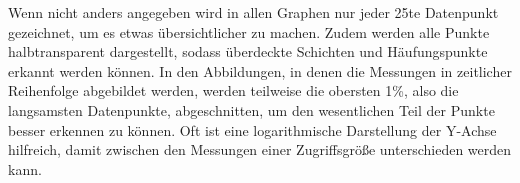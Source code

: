 \documentclass[
	12pt,
	a4paper,
	BCOR10mm,
	DIV14,
	listof=totoc,
	bibliography=totoc,
	headsepline
]{scrreprt}
\begin{document}
Wenn nicht anders angegeben wird in allen Graphen nur jeder 25te Datenpunkt gezeichnet, um es etwas übersichtlicher zu machen.
Zudem werden alle Punkte halbtransparent dargestellt, sodass überdeckte Schichten und Häufungspunkte erkannt werden können.
In den Abbildungen, in denen die Messungen in zeitlicher Reihenfolge abgebildet werden, werden teilweise die obersten 1\%, also die langsamsten Datenpunkte, abgeschnitten, um den wesentlichen Teil der Punkte besser erkennen zu können.
Oft ist eine logarithmische Darstellung der Y-Achse hilfreich, damit zwischen den Messungen einer Zugriffsgröße unterschieden werden kann. 
\begin{figure}
	\hfill
	\\
	\hfill
\end{figure}
\end{document}

